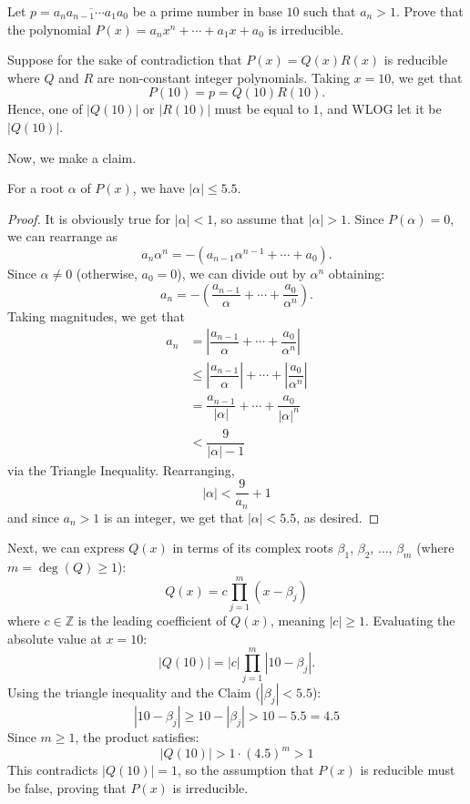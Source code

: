 \documentclass[11pt]{scrartcl}
\begin{document}
\begin{example*}
Let $p = \overline{a_na_{n-1}\cdots a_1a_0}$ be a prime number in base $10$ such that $a_n > 1$. Prove that the polynomial $P(x) = a_nx^n + \cdots + a_1x + a_0$ is irreducible.
\end{example*}

Suppose for the sake of contradiction that $P(x) = Q(x)R(x)$ is reducible where $Q$ and $R$ are non-constant integer polynomials. Taking $x = 10$, we get that \[P(10) = p = Q(10)R(10).\] Hence, one of $|Q(10)|$ or $|R(10)|$ must be equal to $1$, and WLOG let it be $|Q(10)|$.

Now, we make a claim.

\begin{claim*}
For a root $\alpha$ of $P(x)$, we have $|\alpha| \le 5.5$.
\end{claim*}
\begin{proof}
It is obviously true for $|\alpha| < 1$, so assume that $|\alpha| > 1$. Since $P(\alpha) = 0$, we can rearrange as \[a_n\alpha^n = -(a_{n-1}\alpha^{n-1}+\cdots+a_0).\] Since $\alpha \neq 0$ (otherwise, $a_0 = 0$), we can divide out by $\alpha^n$ obtaining: \[a_n = -\left(\dfrac{a_{n-1}}{\alpha}+\cdots+\dfrac{a_0}{\alpha^n}\right).\] Taking magnitudes, we get that
\begin{align*}
a_n &= \left|\dfrac{a_{n-1}}{\alpha}+\cdots+\dfrac{a_0}{\alpha^n}\right| \\
&\le \left|\dfrac{a_{n-1}}{\alpha}\right|+\cdots+\left|\dfrac{a_0}{\alpha^n}\right| \\
&= \dfrac{a_{n-1}}{|\alpha|}+\cdots+\dfrac{a_0}{|\alpha|^n} \\
&< \dfrac{9}{|\alpha|-1}
\end{align*}
via the Triangle Inequality. Rearranging, \[|\alpha| < \dfrac{9}{a_n}+1\] and since $a_n > 1$ is an integer, we get that $|\alpha| < 5.5$, as desired.
\end{proof}

Next, we can express $Q(x)$ in terms of its complex roots $\beta_1$, $\beta_2$, $\dots$, $\beta_m$ (where $m = \deg(Q) \ge 1$): \[Q(x)=c\prod _{j=1}^{m}(x-\beta _{j})\] where $c \in \mathbb{Z}$ is the leading coefficient of $Q(x)$, meaning $|c| \ge 1$. Evaluating the absolute value at $x = 10$: \[|Q(10)|=|c|\prod _{j=1}^m|10-\beta _{j}|.\]Using the triangle inequality and the Claim ($|\beta_j| < 5.5$):\[|10-\beta _{j}|\ge 10-|\beta _j|>10-5.5=4.5\]Since $m \ge 1$, the product satisfies: \[|Q(10)|>1\cdot (4.5)^m>1\]This contradicts $|Q(10)| = 1$, so the assumption that $P(x)$ is reducible must be false, proving that $P(x)$ is irreducible.
\end{document}
